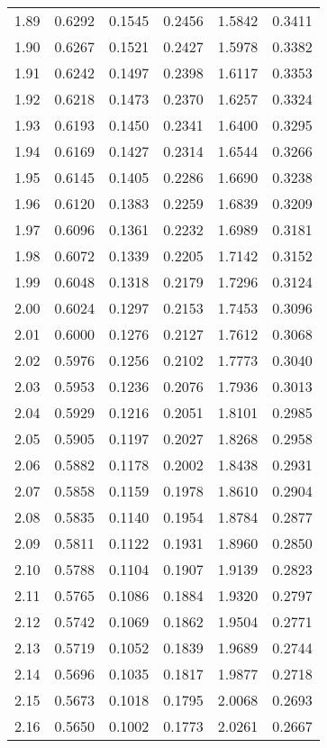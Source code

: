 \documentclass{article}
\begin{document}
\begin{longtable}{cccccc}
1.89 & 0.6292 & 0.1545 & 0.2456 & 1.5842 & 0.3411 \\
1.90 & 0.6267 & 0.1521 & 0.2427 & 1.5978 & 0.3382 \\
1.91 & 0.6242 & 0.1497 & 0.2398 & 1.6117 & 0.3353 \\
1.92 & 0.6218 & 0.1473 & 0.2370 & 1.6257 & 0.3324 \\
1.93 & 0.6193 & 0.1450 & 0.2341 & 1.6400 & 0.3295 \\
1.94 & 0.6169 & 0.1427 & 0.2314 & 1.6544 & 0.3266 \\
1.95 & 0.6145 & 0.1405 & 0.2286 & 1.6690 & 0.3238 \\
1.96 & 0.6120 & 0.1383 & 0.2259 & 1.6839 & 0.3209 \\
1.97 & 0.6096 & 0.1361 & 0.2232 & 1.6989 & 0.3181 \\
1.98 & 0.6072 & 0.1339 & 0.2205 & 1.7142 & 0.3152 \\
1.99 & 0.6048 & 0.1318 & 0.2179 & 1.7296 & 0.3124 \\
2.00 & 0.6024 & 0.1297 & 0.2153 & 1.7453 & 0.3096 \\
2.01 & 0.6000 & 0.1276 & 0.2127 & 1.7612 & 0.3068 \\
2.02 & 0.5976 & 0.1256 & 0.2102 & 1.7773 & 0.3040 \\
2.03 & 0.5953 & 0.1236 & 0.2076 & 1.7936 & 0.3013 \\
2.04 & 0.5929 & 0.1216 & 0.2051 & 1.8101 & 0.2985 \\
2.05 & 0.5905 & 0.1197 & 0.2027 & 1.8268 & 0.2958 \\
2.06 & 0.5882 & 0.1178 & 0.2002 & 1.8438 & 0.2931 \\
2.07 & 0.5858 & 0.1159 & 0.1978 & 1.8610 & 0.2904 \\
2.08 & 0.5835 & 0.1140 & 0.1954 & 1.8784 & 0.2877 \\
2.09 & 0.5811 & 0.1122 & 0.1931 & 1.8960 & 0.2850 \\
2.10 & 0.5788 & 0.1104 & 0.1907 & 1.9139 & 0.2823 \\
2.11 & 0.5765 & 0.1086 & 0.1884 & 1.9320 & 0.2797 \\
2.12 & 0.5742 & 0.1069 & 0.1862 & 1.9504 & 0.2771 \\
2.13 & 0.5719 & 0.1052 & 0.1839 & 1.9689 & 0.2744 \\
2.14 & 0.5696 & 0.1035 & 0.1817 & 1.9877 & 0.2718 \\
2.15 & 0.5673 & 0.1018 & 0.1795 & 2.0068 & 0.2693 \\
2.16 & 0.5650 & 0.1002 & 0.1773 & 2.0261 & 0.2667 \\

\end{longtable}
\end{document}
